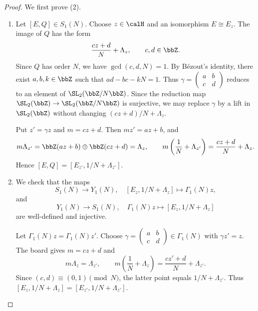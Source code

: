 \begin{proof}
    We first prove (2).
    \begin{enumerate}[label=\textit{Step~\arabic*.}]
        \item Let $[E, Q] \in S_1(N)$. Choose $z \in \calH$ and an isomorphism $E \cong E_z$. The image of $Q$ has the form
        \[
            \frac{cz + d}{N} + \Lambda_z, \qquad c, d \in \bbZ.
        \]
        Since $Q$ has order $N$, we have $\gcd(c, d, N) = 1$. By B\'ezout's identity, there exist $a, b, k \in \bbZ$ such that $ad - bc - kN = 1$. Thus $\gamma = \begin{pmatrix}a & b\\ c & d\end{pmatrix}$ reduces to an element of $\SL_2(\bbZ/N\bbZ)$. Since the reduction map $\SL_2(\bbZ) \to \SL_2(\bbZ/N\bbZ)$ is surjective, we may replace $\gamma$ by a lift in $\SL_2(\bbZ)$ without changing $(cz + d)/N + \Lambda_z$.

        Put $z' = \gamma z$ and $m = cz + d$. Then $mz' = az + b$, and
        \[
            m\Lambda_{z'} = \bbZ(az + b) \oplus \bbZ(cz + d) = \Lambda_z, \qquad m\left(\frac{1}{N} + \Lambda_{z'}\right) = \frac{cz + d}{N} + \Lambda_z.
        \]
        Hence $[E, Q] = [E_{z'}, 1/N + \Lambda_{z'}]$.
        \item We check that the maps
        \[
            S_1(N) \longrightarrow Y_1(N), \quad [E_z, 1/N + \Lambda_z] \longmapsto \Gamma_1(N)z,
        \]
        and
        \[
            Y_1(N) \longrightarrow S_1(N), \quad \Gamma_1(N)z \longmapsto [E_z, 1/N + \Lambda_z]
        \]
        are well-defined and injective.

        Let $\Gamma_1(N)z = \Gamma_1(N)z'$. Choose $\gamma = \begin{pmatrix}a & b\\ c & d\end{pmatrix} \in \Gamma_1(N)$ with $\gamma z' = z$. The board gives $m = cz + d$ and
        \[
            m\Lambda_z = \Lambda_{z'}, \qquad m\left(\frac{1}{N} + \Lambda_z\right) = \frac{cz' + d}{N} + \Lambda_{z'}.
        \]
        Since $(c, d) \equiv (0, 1) \pmod N$, the latter point equals $1/N + \Lambda_{z'}$. Thus $[E_z, 1/N + \Lambda_z] = [E_{z'}, 1/N + \Lambda_{z'}]$.


\end{enumerate}
\end{proof}
